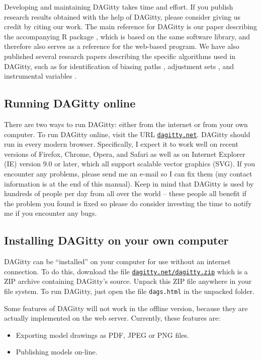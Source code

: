 \documentclass[a4paper]{article} %
\newcommand{\pp}{{\sc DAG}itty\xspace}
\begin{document}
Developing and maintaining \pp takes time and effort.
If you publish research results obtained
with the help of \pp, please 
consider giving us credit by citing our work. 
The main reference
for \pp is our paper describing the accompanying R package \cite{textor_robust_2016}, 
which is based on the same software library, and therefore also serves as a reference for the web-based program.
 We have also published several research papers describing the specific algorithms used in DAGitty, such as for identification of biasing paths \cite{TextorL2011}, adjustment sets \cite{textor14_uai}, and instrumental variables
\cite{zander15_instrument}.




\subsection{Running \pp online}

There are two ways to run \pp: either from the internet or from your
own computer. To run \pp online, visit the URL
\href{http://www.dagitty.net}{\tt dagitty.net}.
\pp should run in every modern browser. Specifically, I expect it
to work well on recent versions of Firefox, Chrome, Opera, and Safari
as well as on Internet Explorer (IE) version 9.0 or later, which all
support scalable vector graphics (SVG). If you encounter any problems, please send
me an e-mail so I can fix them (my contact information is at the end of this manual). 
Keep in mind that \pp is used by hundreds of people per day from all over the world -- these people all benefit if the problem you found is fixed so please do consider investing the time to notify me if you encounter any bugs.

\subsection{Installing \pp on your own computer} 

\pp can be ``installed'' on your computer for use without an internet
connection. To do this, download the file 
\href{http://www.dagitty.net/dagitty.zip}{\tt dagitty.net/dagitty.zip}
which is a ZIP archive containing \pp's source. Unpack this ZIP file anywhere
in your file system. To run \pp, just open the file \verb|dags.html| in the
unpacked folder. 

Some features of \pp will not work in the offline version, because they
are actually implemented on the web server. Currently, these features are:
\begin{itemize}
\item Exporting model drawings as PDF, JPEG or PNG files.
\item Publishing models on-line.
\end{itemize}
\end{document}
